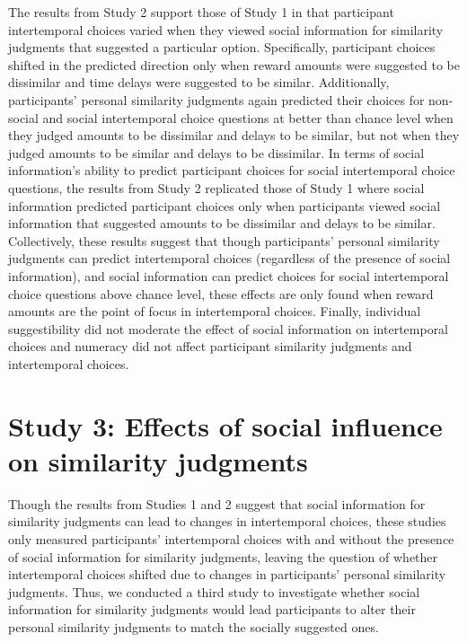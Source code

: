 \documentclass[
  pub,floatsintext]{apa6}
\begin{document}
The results from Study 2 support those of Study 1 in that participant intertemporal choices varied when they viewed social information for similarity judgments that suggested a particular option. Specifically, participant choices shifted in the predicted direction only when reward amounts were suggested to be dissimilar and time delays were suggested to be similar. Additionally, participants' personal similarity judgments again predicted their choices for non-social and social intertemporal choice questions at better than chance level when they judged amounts to be dissimilar and delays to be similar, but not when they judged amounts to be similar and delays to be dissimilar. In terms of social information's ability to predict participant choices for social intertemporal choice questions, the results from Study 2 replicated those of Study 1 where social information predicted participant choices only when participants viewed social information that suggested amounts to be dissimilar and delays to be similar. Collectively, these results suggest that though participants' personal similarity judgments can predict intertemporal choices (regardless of the presence of social information), and social information can predict choices for social intertemporal choice questions above chance level, these effects are only found when reward amounts are the point of focus in intertemporal choices. Finally, individual suggestibility did not moderate the effect of social information on intertemporal choices and numeracy did not affect participant similarity judgments and intertemporal choices.

\hypertarget{study-3-effects-of-social-influence-on-similarity-judgments}{%
\section{Study 3: Effects of social influence on similarity judgments}\label{study-3-effects-of-social-influence-on-similarity-judgments}}

Though the results from Studies 1 and 2 suggest that social information for similarity judgments can lead to changes in intertemporal choices, these studies only measured participants' intertemporal choices with and without the presence of social information for similarity judgments, leaving the question of whether intertemporal choices shifted due to changes in participants' personal similarity judgments. Thus, we conducted a third study to investigate whether social information for similarity judgments would lead participants to alter their personal similarity judgments to match the socially suggested ones.
\end{document}
